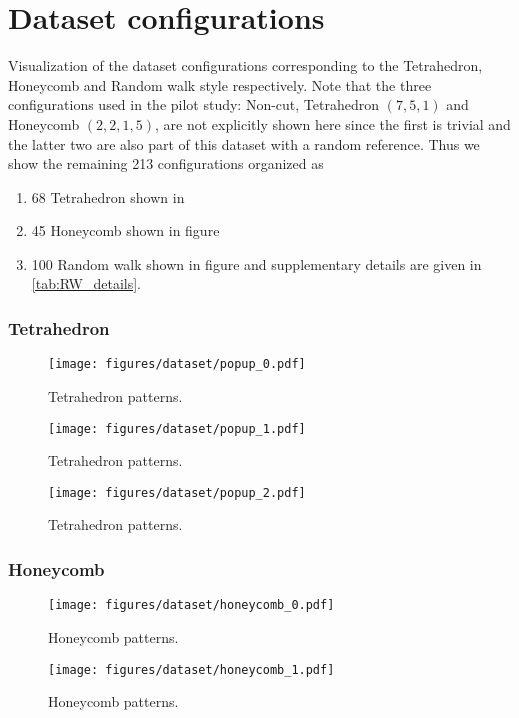 \chapter{Dataset configurations}\label{sec:dataset_conf}
Visualization of the dataset configurations corresponding to the Tetrahedron, Honeycomb and Random walk style respectively. Note that the three configurations used in the pilot study: Non-cut, Tetrahedron $(7,5,1)$ and Honeycomb $(2,2,1,5)$, are not explicitly shown here since the first is trivial and the latter two are also part of this dataset with a random reference. Thus we show the remaining 213 configurations organized as
\begin{enumerate}
    \item 68 Tetrahedron shown in 
    \item 45 Honeycomb shown in figure 
    \item 100 Random walk shown in figure  and supplementary details are given in \cref{tab:RW_details}.
\end{enumerate}
\newpage

\subsection{Tetrahedron}
\begin{figure}[H]
    \centering
    \texttt{[image: figures/dataset/popup\_0.pdf]}
    \caption{Tetrahedron patterns.}
    \label{fig:T0}
\end{figure}
\begin{figure}[H]
    \centering
    \texttt{[image: figures/dataset/popup\_1.pdf]}
    \caption{Tetrahedron patterns.}
    \label{fig:T1}
\end{figure}
\begin{figure}[H]
    \centering
    \texttt{[image: figures/dataset/popup\_2.pdf]}
    \caption{Tetrahedron patterns.}
    \label{fig:T2}
\end{figure}


\subsection{Honeycomb}
\begin{figure}[H]
    \centering
    \texttt{[image: figures/dataset/honeycomb\_0.pdf]}
    \caption{Honeycomb patterns.}
    \label{fig:H0}
\end{figure}
\begin{figure}[H]
    \centering
    \texttt{[image: figures/dataset/honeycomb\_1.pdf]}
    \caption{Honeycomb patterns.}
    \label{fig:H1}
\end{figure}

